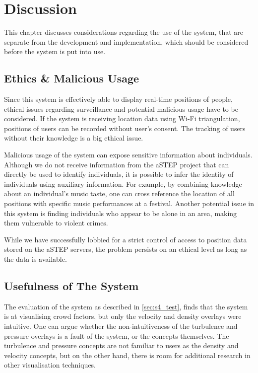 \chapter{Discussion}\label{ch:discussion}

This chapter discusses considerations regarding the use of the system, that are separate from the development and implementation, which should be considered before the system is put into use.

\section{Ethics \& Malicious Usage}
Since this system is effectively able to display real-time positions of people, ethical issues regarding surveillance and potential malicious usage have to be considered. If the system is receiving location data using Wi-Fi triangulation, positions of users can be recorded without user's consent. The tracking of users without their knowledge is a big ethical issue.

Malicious usage of the system can expose sensitive information about individuals. Although we do not receive information from the aSTEP project that can directly be used to identify individuals, it is possible to infer the identity of individuals using auxiliary information. For example, by combining knowledge about an individual's music taste, one can cross reference the location of all positions with specific music performances at a festival. Another potential issue in this system is finding individuals who appear to be alone in an area, making them vulnerable to violent crimes.

While we have successfully lobbied for a strict control of access to position data stored on the aSTEP servers, the problem persists on an ethical level as long as the data is available. 

\section{Usefulness of The System}
The evaluation of the system as described in \cref{sec:s4_test}, finds that the system is  at visualising crowd factors, but only the velocity and density overlays were intuitive. One can argue whether the non-intuitiveness of the turbulence and pressure overlays is a fault of the system, or the concepts themselves. The turbulence and pressure concepts are not familiar to users as the density and velocity concepts, but on the other hand, there is room for additional research in other visualisation techniques. 


